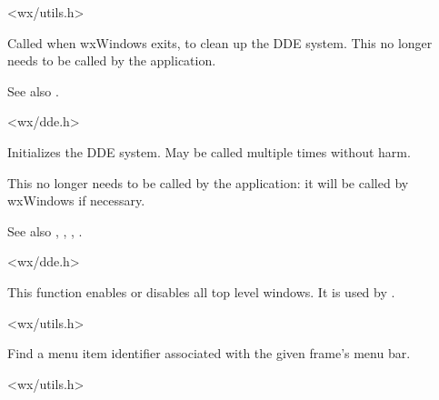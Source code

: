 
<wx/utils.h>

\label{wxddecleanup}


Called when wxWindows exits, to clean up the DDE system. This no longer needs to be
called by the application.

See also .


<wx/dde.h>

\label{wxddeinitialize}


Initializes the DDE system. May be called multiple times without harm.

This no longer needs to be called by the application: it will be called
by wxWindows if necessary.

See also , , ,
.


<wx/dde.h>

\label{wxenabletoplevelwindows}


This function enables or disables all top level windows. It is used by
.


<wx/utils.h>

\label{wxfindmenuitemid}


Find a menu item identifier associated with the given frame's menu bar.


<wx/utils.h>

\label{wxfindwindowbylabel}


